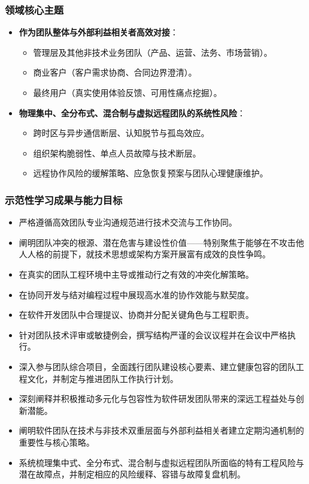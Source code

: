 \subsubsection{领域核心主题}
\begin{itemize}
    \item \textbf{作为团队整体与外部利益相关者高效对接}：
    \begin{itemize}
        \item 管理层及其他非技术业务团队（产品、运营、法务、市场营销）。
        \item 商业客户（客户需求协商、合同边界澄清）。
        \item 最终用户（真实使用体验反馈、可用性痛点挖掘）。
    \end{itemize}
    \item \textbf{物理集中、全分布式、混合制与虚拟远程团队的系统性风险}：
    \begin{itemize}
        \item 跨时区与异步通信断层、认知脱节与孤岛效应。
        \item 组织架构脆弱性、单点人员故障与技术断层。
        \item 远程协作风险的缓解策略、应急恢复预案与团队心理健康维护。
    \end{itemize}
\end{itemize}

\subsubsection{示范性学习成果与能力目标}
\begin{itemize}
    \item 严格遵循高效团队专业沟通规范进行技术交流与工作协同。
    \item 阐明团队冲突的根源、潜在危害与建设性价值——特别聚焦于能够在不攻击他人人格的前提下，就技术思想或架构方案开展富有成效的良性争鸣。
    \item 在真实的团队工程环境中主导或推动行之有效的冲突化解策略。
    \item 在协同开发与结对编程过程中展现高水准的协作效能与默契度。
    \item 在软件开发团队中合理提议、协商并分配关键角色与工程职责。
    \item 针对团队技术评审或敏捷例会，撰写结构严谨的会议议程并在会议中严格执行。
    \item 深入参与团队综合项目，全面践行团队建设核心要素、建立健康包容的团队工程文化，并制定与推进团队工作执行计划。
    \item 深刻阐释并积极推动多元化与包容性为软件研发团队带来的深远工程益处与创新潜能。
    \item 阐明软件团队在技术与非技术双重层面与外部利益相关者建立定期沟通机制的重要性与核心策略。
    \item 系统梳理集中式、全分布式、混合制与虚拟远程团队所面临的特有工程风险与潜在故障点，并制定相应的风险缓释、容错与故障复盘机制。
\end{itemize}

